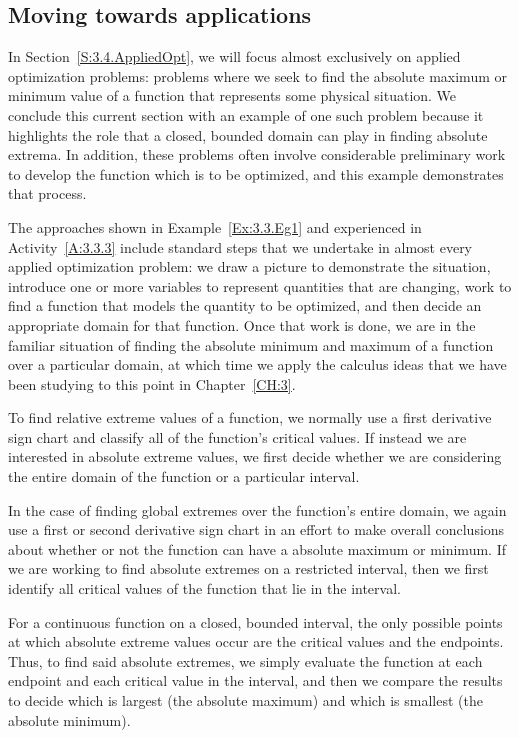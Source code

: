 \subsection*{Moving towards applications}

In Section~\ref{S:3.4.AppliedOpt}, we will focus almost exclusively on applied optimization problems:  problems where we seek to find the absolute maximum or minimum value of a function that represents some physical situation.  We conclude this current section with an example of one such problem because it highlights the role that a closed, bounded domain can play in finding absolute extrema.  In addition, these problems often involve considerable preliminary work to develop the function which is to be optimized, and this example demonstrates that process.



The approaches shown in Example~\ref{Ex:3.3.Eg1} and experienced in Activity~\ref{A:3.3.3} include standard steps that we undertake in almost every applied optimization problem:  we draw a picture to demonstrate the situation, introduce one or more variables to represent quantities that are changing, work to find a function that models the quantity to be optimized, and then decide an appropriate domain for that function.  Once that work is done, we are in the familiar situation of finding the absolute minimum and maximum of a function over a particular domain, at which time we apply the calculus ideas that we have been studying to this point in Chapter~\ref{CH:3}.

\begin{summary}
\item To find relative extreme values of a function, we normally use a first derivative sign chart and classify all of the function's critical values.  If instead we are interested in absolute extreme values, we first decide whether we are considering the entire domain of the function or a particular interval.  
\item In the case of finding global extremes over the function's entire domain, we again use a first or second derivative sign chart in an effort to make overall conclusions about whether or not the function can have a absolute maximum or minimum.
If we are working to find absolute extremes on a restricted interval, then we first identify all critical values of the function that lie in the interval.
\item For a continuous function on a closed, bounded interval, the only possible points at which absolute extreme values occur are the critical values and the endpoints.  Thus, to find said absolute extremes, we simply evaluate the function at each endpoint and each critical value in the interval, and then we compare the results to decide which is largest (the absolute maximum) and which is smallest (the absolute minimum). 
\end{summary}

\clearpage

 

\cleardoublepage